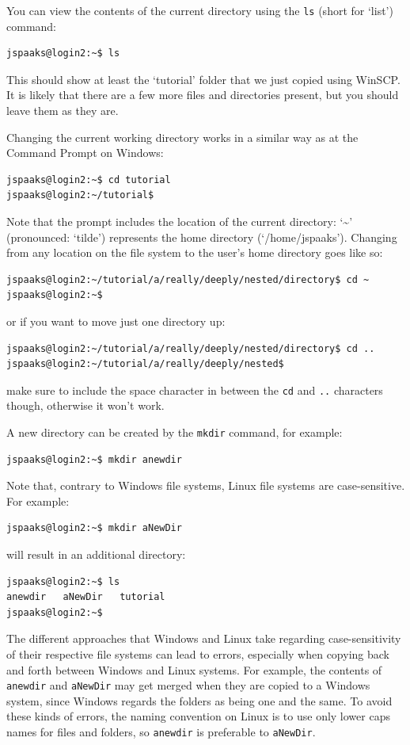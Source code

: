You can view the contents of the current directory using the \texttt{ls} (short for `list') command:
\begin{lstlisting}[style=basic,style=bash]
jspaaks@login2:~$ ls
\end{lstlisting}
This should show at least the `tutorial' folder that we just copied using WinSCP. It is likely that there are a few more files and directories present, but you should leave them as they are.

Changing the current working directory works in a similar way as at the Command Prompt on Windows:
\begin{lstlisting}[style=basic,style=bash]
jspaaks@login2:~$ cd tutorial
jspaaks@login2:~/tutorial$
\end{lstlisting}
Note that the prompt includes the location of the current directory: `\textasciitilde' (pronounced: `tilde') represents the home directory (`/home/jspaaks').
Changing from any location on the file system to the user's home directory goes like so:
\begin{lstlisting}[style=basic,style=bash]
jspaaks@login2:~/tutorial/a/really/deeply/nested/directory$ cd ~
jspaaks@login2:~$
\end{lstlisting}
or if you want to move just one directory up:
\begin{lstlisting}[style=basic,style=bash]
jspaaks@login2:~/tutorial/a/really/deeply/nested/directory$ cd ..
jspaaks@login2:~/tutorial/a/really/deeply/nested$
\end{lstlisting}
make sure to include the space character in between the \texttt{cd} and \texttt{..} characters though, otherwise it won't work.

A new directory can be created by the \texttt{mkdir} command, for example:
\begin{lstlisting}[style=basic,style=bash]
jspaaks@login2:~$ mkdir anewdir
\end{lstlisting}
Note that, contrary to Windows file systems, Linux file systems are case-sensitive. For example:
\begin{lstlisting}[style=basic,style=bash]
jspaaks@login2:~$ mkdir aNewDir
\end{lstlisting}
will result in an additional directory:
\begin{lstlisting}[style=basic,style=bash]
jspaaks@login2:~$ ls
anewdir   aNewDir   tutorial
jspaaks@login2:~$
\end{lstlisting}
The different approaches that Windows and Linux take regarding case-sensitivity of their respective file systems can lead to errors, especially when copying back and forth between Windows and Linux systems. For example, the contents of \lstinline{anewdir} and \lstinline{aNewDir} may get merged when they are copied to a Windows system, since Windows regards the folders as being one and the same. To avoid these kinds of errors, the naming convention on Linux is to use only lower caps names for files and folders, so \lstinline{anewdir} is preferable to  \lstinline{aNewDir}.

